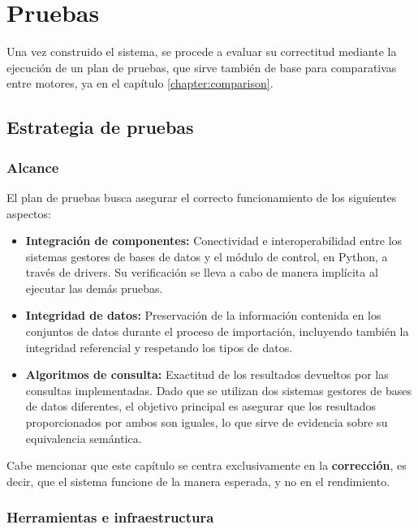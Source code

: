 
\chapter{Pruebas} \label{chapter:tests}

Una vez construido el sistema, se procede a evaluar su correctitud mediante la ejecución de un plan de pruebas, que sirve también de base para comparativas entre motores, ya en el capítulo \ref{chapter:comparison}.

\section{Estrategia de pruebas}

\subsection{Alcance}

El plan de pruebas busca asegurar el correcto funcionamiento de los siguientes aspectos:

\begin{itemize}
    \item \textbf{Integración de componentes:} Conectividad e interoperabilidad entre los sistemas gestores de bases de datos y el módulo de control, en Python, a través de drivers. Su verificación se lleva a cabo de manera implícita al ejecutar las demás pruebas.
    \item \textbf{Integridad de datos:} Preservación de la información contenida en los conjuntos de datos durante el proceso de importación, incluyendo también la integridad referencial y respetando los tipos de datos.
    \item \textbf{Algoritmos de consulta:} Exactitud de los resultados devueltos por las consultas implementadas. Dado que se utilizan dos sistemas gestores de bases de datos diferentes, el objetivo principal es asegurar que los resultados proporcionados por ambos son iguales, lo que sirve de evidencia sobre su equivalencia semántica.
\end{itemize}

Cabe mencionar que este capítulo se centra exclusivamente en la \textbf{corrección}, es decir, que el sistema funcione de la manera esperada, y no en el rendimiento.

\subsection{Herramientas e infraestructura}

